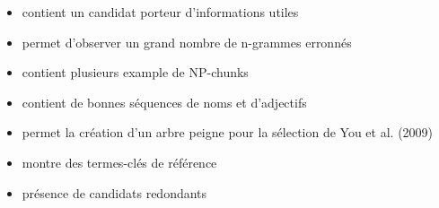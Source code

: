 \begin{itemize}
  \item{contient un candidat porteur d'informations utiles}
  \item{permet d'observer un grand nombre de n-grammes erronnés}
  \item{contient plusieurs example de NP-chunks}
  \item{contient de bonnes séquences de noms et d'adjectifs}
  \item{permet la création d'un arbre peigne pour la sélection de You et al. (2009)}
  \item{montre des termes-clés de référence}
  \item{présence de candidats redondants}
\end{itemize}
